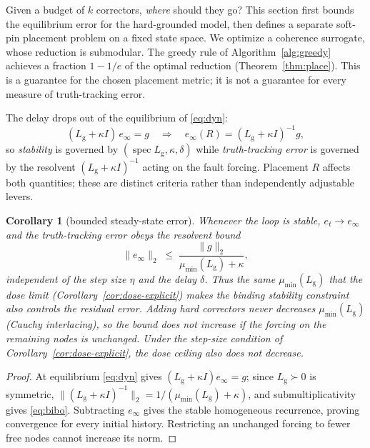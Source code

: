 \documentclass[11pt]{article}
\newtheorem{corollary}{Corollary}
\theoremstyle{definition}
\newcommand{\Lg}{L_{\mathrm g}}
\newcommand{\spec}{\operatorname{spec}}
\begin{document}
Given a budget of $k$ correctors, \emph{where} should they go? This section first bounds the
equilibrium error for the hard-grounded model, then defines a separate soft-pin placement
problem on a fixed state space. We optimize a coherence surrogate,
whose reduction is submodular. The greedy rule of Algorithm~\ref{alg:greedy} achieves a fraction
$1-1/e$ of the optimal reduction (Theorem~\ref{thm:place}). This is a guarantee for the chosen
placement metric; it is not a guarantee for every measure of truth-tracking error.

The delay drops out of the equilibrium of \eqref{eq:dyn}:
\begin{equation}\label{eq:ss}
  (\Lg+\kappa I)\,e_\infty = g \quad\Longrightarrow\quad e_\infty(R)=(\Lg+\kappa I)^{-1}g,
\end{equation}
so \emph{stability} is governed by $(\spec\Lg,\kappa,\delta)$ while \emph{truth-tracking error} is
governed by the resolvent $(\Lg+\kappa I)^{-1}$ acting on the fault forcing. Placement $R$ affects
both quantities; these are distinct criteria rather than independently adjustable levers.

\begin{corollary}[bounded steady-state error]\label{cor:bibo}
Whenever the loop is stable, $e_t\to e_\infty$ and the truth-tracking error obeys the resolvent bound
\begin{equation}\label{eq:bibo}
  \|e_\infty\|_2 \;\le\; \frac{\|g\|_2}{\mu_{\min}(\Lg)+\kappa},
\end{equation}
independent of the step size $\eta$ and the delay $\delta$. Thus the same $\mu_{\min}(\Lg)$ that the
dose limit (Corollary~\ref{cor:dose-explicit}) makes the binding stability constraint also controls the
residual error. Adding hard correctors never decreases $\mu_{\min}(\Lg)$ (Cauchy interlacing),
so the bound does not increase if the forcing on the remaining nodes is unchanged. Under the
step-size condition of Corollary~\ref{cor:dose-explicit}, the dose ceiling also does not decrease.
\end{corollary}
\begin{proof}
At equilibrium \eqref{eq:dyn} gives $(\Lg+\kappa I)e_\infty=g$; since $\Lg\succ0$ is symmetric,
$\|(\Lg+\kappa I)^{-1}\|_2=1/(\mu_{\min}(\Lg)+\kappa)$, and submultiplicativity gives \eqref{eq:bibo}.
Subtracting $e_\infty$ gives the stable homogeneous recurrence, proving convergence for every
initial history. Restricting an unchanged forcing to fewer free nodes cannot increase its norm.
\end{proof}
\end{document}
